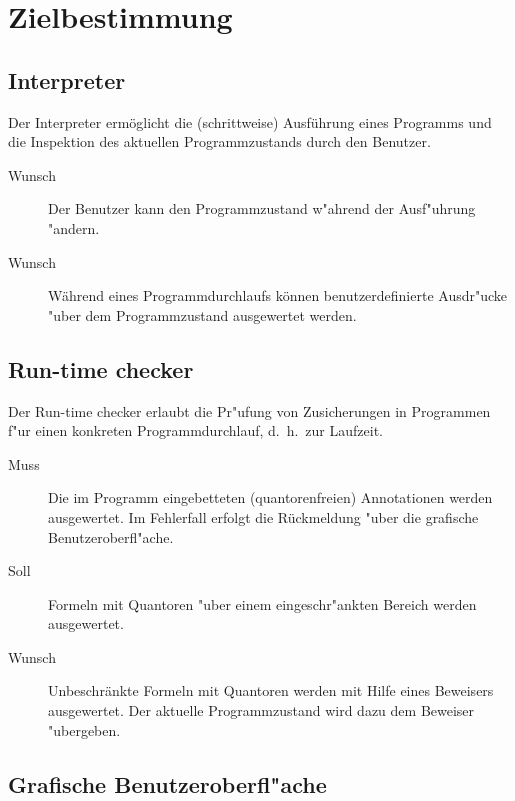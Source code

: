 \section{Zielbestimmung}%


\subsection{Interpreter}%

Der \see Interpreter ermöglicht die (schrittweise) Ausführung eines \see Programms und die Inspektion des aktuellen \see Programmzustands durch den Benutzer.%

\begin{description}%
    \item[Wunsch] Der Benutzer kann den Programmzustand w"ahrend der Ausf"uhrung "andern.%
    \item[Wunsch] Während eines Programmdurchlaufs können benutzerdefinierte \see Ausdr"ucke "uber dem Programmzustand ausgewertet werden.%
\end{description}%

\subsection{Run-time checker}%

Der \see Run-time checker erlaubt die Pr"ufung von \see Zusicherungen in Programmen f"ur einen konkreten Programmdurchlauf, d.~h.\ zur Laufzeit.%

\begin{description}%
    \item [Muss] Die im Programm eingebetteten (quantorenfreien) \see Annotationen werden ausgewertet. Im Fehlerfall erfolgt die Rückmeldung "uber die grafische Benutzeroberfl"ache.
    \item [Soll] Formeln mit \see Quantoren "uber einem eingeschr"ankten Bereich werden ausgewertet.%
    \item [Wunsch] Unbeschränkte Formeln mit Quantoren werden mit Hilfe eines \see Beweisers ausgewertet. Der aktuelle Programmzustand wird dazu dem Beweiser "ubergeben.
\end{description}%

\subsection{Grafische Benutzeroberfl"ache}%

